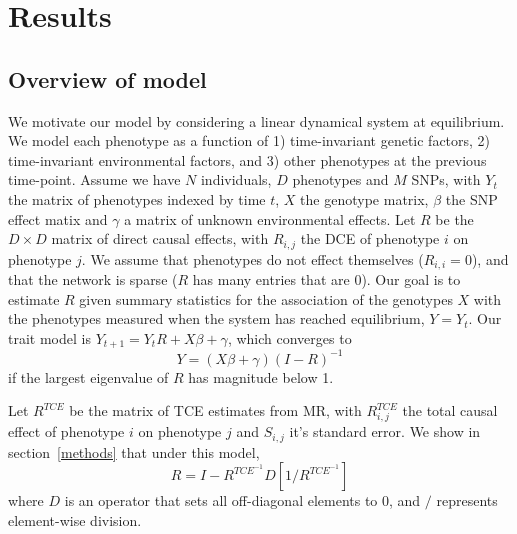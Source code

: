 \documentclass{article}
\begin{document}
\section{Results}
\subsection*{Overview of model}

We motivate our model by considering a linear dynamical system at equilibrium.
We model each phenotype as a function of 1) time-invariant genetic factors, 2)
time-invariant environmental factors, and 3) other phenotypes at the previous
time-point.
Assume we have $N$ individuals, $D$ phenotypes and $M$ SNPs,
with $Y_t$ the matrix of phenotypes indexed by time $t$, $X$ the genotype
matrix, $\beta$ the SNP effect matix and $\gamma$ a matrix of unknown
environmental effects. Let $R$ be the $D \times D$ matrix of
direct causal effects, with $R_{i, j}$ the DCE of phenotype $i$ on
phenotype $j$. We assume that phenotypes do not effect themselves ($R_{i,i} = 0$),
and that the network is sparse ($R$ has many entries that are $0$).
Our goal is to estimate $R$ given summary statistics
 for the association of the genotypes $X$ with the phenotypes measured when
 the system has reached equilibrium, $Y = Y_{t}$.
 Our trait model is $Y_{t+1} = Y_{t} R + X\beta + \gamma$, which converges to
\begin{equation}\label{model}
Y = (X\beta + \gamma)(I-R)^{-1}
\end{equation}
if the largest eigenvalue of $R$ has magnitude below 1.

Let $R^{TCE}$ be the matrix of TCE estimates from MR, with $R^{TCE}_{i,j}$ the total
causal effect of phenotype $i$ on phenotype $j$ and $S_{i,j}$ it's standard error.
We show in section~\ref{methods} that under this model,
\begin{equation}\label{r_dce_main}
R = I - R^{TCE^{-1}} D[1 / R^{TCE^{-1}}]
\end{equation}
where $D$ is an operator that sets all off-diagonal elements to 0, and $/$
represents element-wise division.
\end{document}
